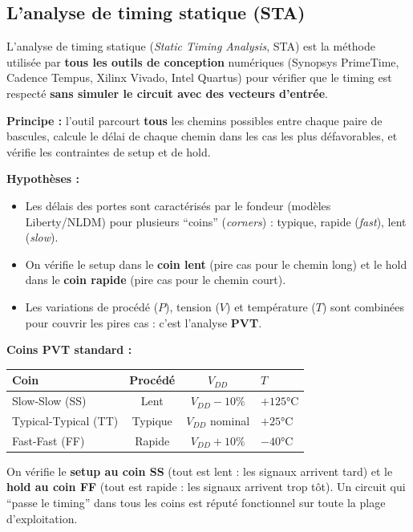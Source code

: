 \documentclass[12pt,a4paper,twoside]{book}
\begin{document}
\subsection{L'analyse de timing statique (STA)}

\begin{formule}
L'analyse de timing statique (\textit{Static Timing Analysis}, STA) est la méthode utilisée par \textbf{tous les outils de conception} numériques (Synopsys PrimeTime, Cadence Tempus, Xilinx Vivado, Intel Quartus) pour vérifier que le timing est respecté \textbf{sans simuler le circuit avec des vecteurs d'entrée}.

\textbf{Principe :} l'outil parcourt \textbf{tous} les chemins possibles entre chaque paire de bascules, calcule le délai de chaque chemin dans les cas les plus défavorables, et vérifie les contraintes de setup et de hold.

\textbf{Hypothèses :}
\begin{itemize}[nosep]
\item Les délais des portes sont caractérisés par le fondeur (modèles Liberty/NLDM) pour plusieurs ``coins'' (\textit{corners}) : typique, rapide (\textit{fast}), lent (\textit{slow}).
\item On vérifie le setup dans le \textbf{coin lent} (pire cas pour le chemin long) et le hold dans le \textbf{coin rapide} (pire cas pour le chemin court).
\item Les variations de procédé ($P$), tension ($V$) et température ($T$) sont combinées pour couvrir les pires cas : c'est l'analyse \textbf{PVT}.
\end{itemize}
\end{formule}

\begin{pratique}
\textbf{Coins PVT standard :}

\begin{center}
\renewcommand{\arraystretch}{1.3}
\begin{tabular}{p{3cm}ccp{4.5cm}}
\toprule
\textbf{Coin} & \textbf{Procédé} & \textbf{$V_{DD}$} & \textbf{$T$} \\
\midrule
Slow-Slow (SS) & Lent & $V_{DD} - 10\%$ & $+125°$C \\
Typical-Typical (TT) & Typique & $V_{DD}$ nominal & $+25°$C \\
Fast-Fast (FF) & Rapide & $V_{DD} + 10\%$ & $-40°$C \\
\bottomrule
\end{tabular}
\end{center}

On vérifie le \textbf{setup au coin SS} (tout est lent : les signaux arrivent tard) et le \textbf{hold au coin FF} (tout est rapide : les signaux arrivent trop tôt). Un circuit qui ``passe le timing'' dans tous les coins est réputé fonctionnel sur toute la plage d'exploitation.
\end{pratique}
\end{document}
